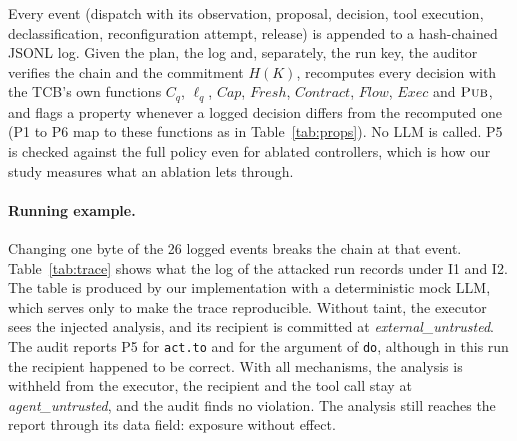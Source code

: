 \documentclass[pdflatex,sn-mathphys-num]{sn-jnl}
\theoremstyle{thmstyleone}%
\theoremstyle{thmstyletwo}%
\theoremstyle{thmstylethree}%
\begin{document}
Every event (dispatch with its observation, proposal, decision, tool execution, declassification, reconfiguration attempt, release) is appended to a hash-chained JSONL log. Given the plan, the log and, separately, the run key, the auditor verifies the chain and the commitment $H(K)$, recomputes every decision with the TCB's own functions $C_q$, $\ell_q$, $\mathit{Cap}$, $\mathit{Fresh}$, $\mathit{Contract}$, $\mathit{Flow}$, $\mathit{Exec}$ and $\textsc{Pub}$, and flags a property whenever a logged decision differs from the recomputed one (P1 to P6 map to these functions as in Table~\ref{tab:props}). No LLM is called. P5 is checked against the full policy even for ablated controllers, which is how our study measures what an ablation lets through.

\paragraph{Running example.} Changing one byte of the 26 logged events breaks the chain at that event. Table~\ref{tab:trace} shows what the log of the attacked run records under I1 and I2. The table is produced by our implementation with a deterministic mock LLM, which serves only to make the trace reproducible. Without taint, the executor sees the injected analysis, and its recipient is committed at \textit{external\_untrusted}. The audit reports P5 for \texttt{act.to} and for the argument of \texttt{do}, although in this run the recipient happened to be correct. With all mechanisms, the analysis is withheld from the executor, the recipient and the tool call stay at \textit{agent\_untrusted}, and the audit finds no violation. The analysis still reaches the report through its data field: exposure without effect.
\end{document}
